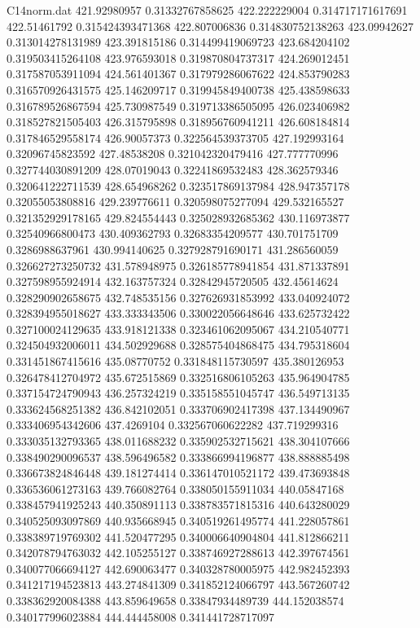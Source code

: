 \begin{filecontents}{C14norm.dat}
421.92980957			0.31332767858625
422.222229004			0.314717171617691
422.51461792			0.315424393471368
422.807006836			0.314830752138263
423.09942627			0.313014278131989
423.391815186			0.314499419069723
423.684204102			0.319503415264108
423.976593018			0.319870804737317
424.269012451			0.317587053911094
424.561401367			0.317979286067622
424.853790283			0.316570926431575
425.146209717			0.319945849400738
425.438598633			0.316789526867594
425.730987549			0.319713386505095
426.023406982			0.318527821505403
426.315795898			0.318956760941211
426.608184814			0.317846529558174
426.90057373			0.322564539373705
427.192993164			0.32096745823592
427.48538208			0.321042320479416
427.777770996			0.327744030891209
428.07019043			0.32241869532483
428.362579346			0.320641222711539
428.654968262			0.323517869137984
428.947357178			0.32055053808816
429.239776611			0.320598075277094
429.532165527			0.321352929178165
429.824554443			0.325028932685362
430.116973877			0.32540966800473
430.409362793			0.32683354209577
430.701751709			0.3286988637961
430.994140625			0.327928791690171
431.286560059			0.326627273250732
431.578948975			0.326185778941854
431.871337891			0.327598955924914
432.163757324			0.32842945720505
432.45614624			0.328290902658675
432.748535156			0.327626931853992
433.040924072			0.328394955018627
433.333343506			0.330022056648646
433.625732422			0.327100024129635
433.918121338			0.323461062095067
434.210540771			0.324504932006011
434.502929688			0.328575404868475
434.795318604			0.331451867415616
435.08770752			0.331848115730597
435.380126953			0.326478412704972
435.672515869			0.332516806105263
435.964904785			0.337154724790943
436.257324219			0.335158551045747
436.549713135			0.333624568251382
436.842102051			0.333706902417398
437.134490967			0.333406954342606
437.4269104			0.332567060622282
437.719299316			0.333035132793365
438.011688232			0.335902532715621
438.304107666			0.338490290096537
438.596496582			0.333866994196877
438.888885498			0.336673824846448
439.181274414			0.336147010521172
439.473693848			0.336536061273163
439.766082764			0.338050155911034
440.05847168			0.338457941925243
440.350891113			0.338783571815316
440.643280029			0.340525093097869
440.935668945			0.340519261495774
441.228057861			0.338389719769302
441.520477295			0.340006640904804
441.812866211			0.342078794763032
442.105255127			0.338746927288613
442.397674561			0.340077066694127
442.690063477			0.340328780005975
442.982452393			0.341217194523813
443.274841309			0.341852124066797
443.567260742			0.338362920084388
443.859649658			0.33847934489739
444.152038574			0.340177996023884
444.444458008			0.341441728717097

\end{filecontents}

